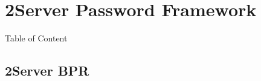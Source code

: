 \documentclass[notes,xcolor=dvipsnames]{beamer}
\begin{document}
%
%
%   


\section{2Server Password Framework}%


\begin{frame}{Table of Content}
\tableofcontents[currentsection]
\end{frame}

\subsection{2Server BPR}

\end{document}
